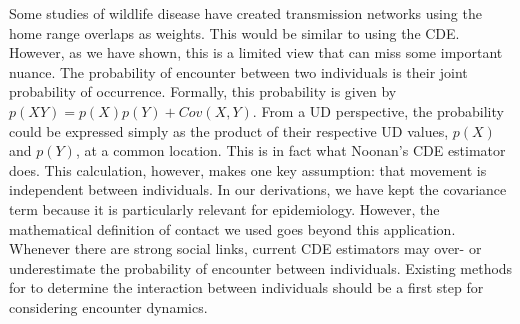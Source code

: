 \documentclass[letterpaper]{article}
\begin{document}


Some studies of wildlife disease have created transmission networks using the home range overlaps as weights. This would be similar to using the CDE.
However, as we have shown, this is a limited view that can miss some important nuance.
The probability of encounter between two individuals is their joint probability of occurrence.  Formally, this probability is given by $p(XY)=p(X)p(Y)+Cov(X,Y)$. From a UD perspective, the probability could be expressed simply as the product of their respective UD values, $p(X)$ and $p(Y)$, at a common location. %
This is in fact what Noonan's CDE estimator does. This calculation, however, makes one key assumption: that movement is independent between individuals. 
In our derivations, we have kept the covariance term because it is particularly relevant for epidemiology. However, the mathematical definition of contact we used goes beyond this application.  Whenever there are strong social links, current CDE estimators may over- or underestimate the probability of encounter between individuals. 
Existing methods for to determine the interaction between individuals \citep{Scharf2018} should be a first step for considering encounter dynamics. 


\end{document}
